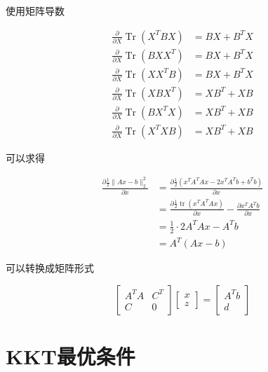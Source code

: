 \begin{remark}
    使用矩阵导数

    $$ \begin{aligned} \frac{\partial}{\partial {X}} \operatorname{Tr}\left({X}^{T} {B X}\right) &={B X}+{B}^{T} {X} \\ \frac{\partial}{\partial {X}} \operatorname{Tr}\left({B X X}^{T}\right) &={B X}+{B}^{T} {X} \\ \frac{\partial}{\partial {X}} \operatorname{Tr}\left({X X}^{T} {B}\right) &={B X}+{B}^{T} {X} \\ \frac{\partial}{\partial {X}} \operatorname{Tr}\left({X B X}^{T}\right) &={X B}^{T}+{X B} \\ \frac{\partial}{\partial {X}} \operatorname{Tr}\left({B X}^{T} {X}\right) &={X B}^{T}+{X B} \\ \frac{\partial}{\partial {X}} \operatorname{Tr}\left({X}^{T} {X B}\right) &={X B}^{T}+{X B} \end{aligned} $$

    可以求得

    $$\begin{aligned}
        \frac{\partial \frac{1}{2} \| Ax-b\| _{2}^{2}}{\partial x} & =\frac{\partial \frac{1}{2}\left( x^{T} A^{T} Ax-2x^{T} A^{T} b+b^{T} b\right)}{\partial x}\\
         & =\frac{\partial \frac{1}{2}\operatorname{tr}\left( x^{T} A^{T} Ax\right)}{\partial x} -\frac{\partial x^{T} A^{T} b}{\partial x}\\
         & =\frac{1}{2} \cdotp 2A^{T} Ax-A^{T} b\\
         & =A^{T}( Ax-b)
        \end{aligned}$$
\end{remark}

可以转换成矩阵形式

$$ \left[\begin{array}{cc}A^{T} A & C^{T} \\ {C} & 0\end{array}\right]\left[\begin{array}{l}x \\ z\end{array}\right]=\left[\begin{array}{l}A^{T} b \\ d\end{array}\right] $$

\section{KKT最优条件}


